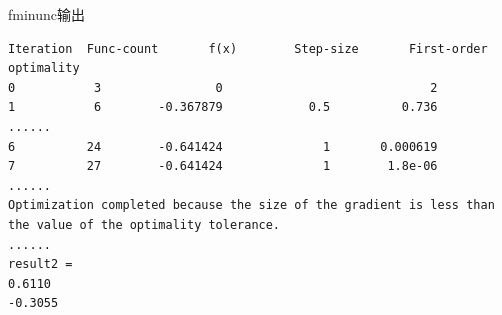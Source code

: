 \documentclass[10pt]{beamer}
\begin{document}
\begin{frame}[t,fragile]{fminunc输出}

\begin{lstlisting}
Iteration  Func-count       f(x)        Step-size       First-order optimality
0           3                0                             2
1           6        -0.367879            0.5          0.736  
......
6          24        -0.641424              1       0.000619  
7          27        -0.641424              1        1.8e-06
......
Optimization completed because the size of the gradient is less than the value of the optimality tolerance.
......
result2 =
0.6110
-0.3055
\end{lstlisting}

\end{frame}

 
\end{document}
